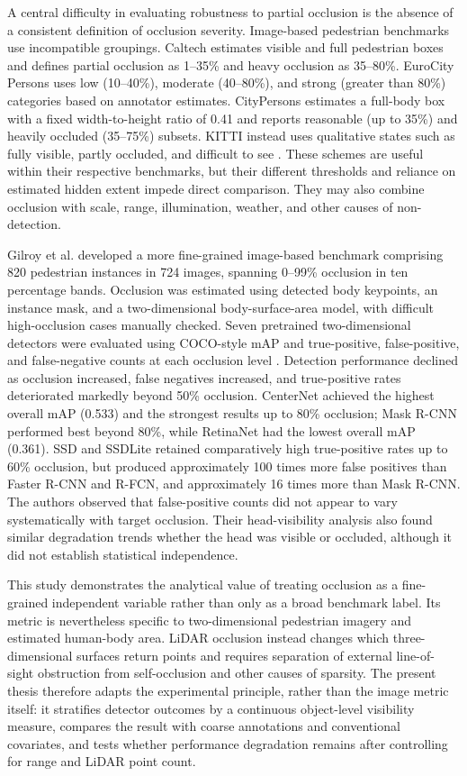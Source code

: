 \documentclass[12pt,a4paper]{article}
\begin{document}
A central difficulty in evaluating robustness to partial occlusion is the absence of a consistent definition of occlusion severity. Image-based pedestrian benchmarks use incompatible groupings. Caltech estimates visible and full pedestrian boxes and defines partial occlusion as 1--35\% and heavy occlusion as 35--80\%. EuroCity Persons uses low (10--40\%), moderate (40--80\%), and strong (greater than 80\%) categories based on annotator estimates. CityPersons estimates a full-body box with a fixed width-to-height ratio of 0.41 and reports reasonable (up to 35\%) and heavily occluded (35--75\%) subsets. KITTI instead uses qualitative states such as fully visible, partly occluded, and difficult to see \cite{bib_ref_32}. These schemes are useful within their respective benchmarks, but their different thresholds and reliance on estimated hidden extent impede direct comparison. They may also combine occlusion with scale, range, illumination, weather, and other causes of non-detection.

Gilroy et al. developed a more fine-grained image-based benchmark comprising 820 pedestrian instances in 724 images, spanning 0--99\% occlusion in ten percentage bands. Occlusion was estimated using detected body keypoints, an instance mask, and a two-dimensional body-surface-area model, with difficult high-occlusion cases manually checked. Seven pretrained two-dimensional detectors were evaluated using COCO-style mAP and true-positive, false-positive, and false-negative counts at each occlusion level \cite{bib_ref_32}. Detection performance declined as occlusion increased, false negatives increased, and true-positive rates deteriorated markedly beyond 50\% occlusion. CenterNet achieved the highest overall mAP (0.533) and the strongest results up to 80\% occlusion; Mask R-CNN performed best beyond 80\%, while RetinaNet had the lowest overall mAP (0.361). SSD and SSDLite retained comparatively high true-positive rates up to 60\% occlusion, but produced approximately 100 times more false positives than Faster R-CNN and R-FCN, and approximately 16 times more than Mask R-CNN. The authors observed that false-positive counts did not appear to vary systematically with target occlusion. Their head-visibility analysis also found similar degradation trends whether the head was visible or occluded, although it did not establish statistical independence.

This study demonstrates the analytical value of treating occlusion as a fine-grained independent variable rather than only as a broad benchmark label. Its metric is nevertheless specific to two-dimensional pedestrian imagery and estimated human-body area. LiDAR occlusion instead changes which three-dimensional surfaces return points and requires separation of external line-of-sight obstruction from self-occlusion and other causes of sparsity. The present thesis therefore adapts the experimental principle, rather than the image metric itself: it stratifies detector outcomes by a continuous object-level visibility measure, compares the result with coarse annotations and conventional covariates, and tests whether performance degradation remains after controlling for range and LiDAR point count.
\end{document}
